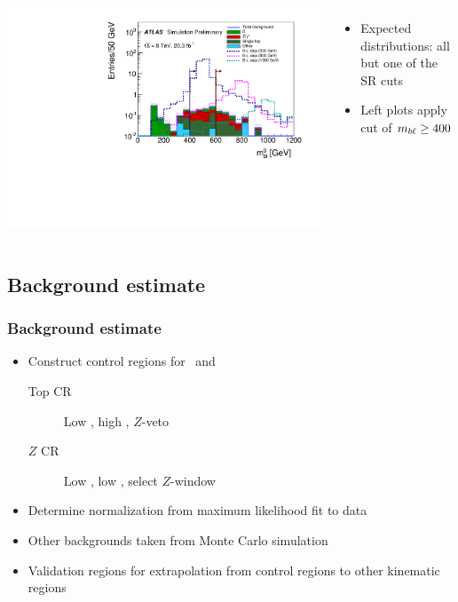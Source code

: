 \documentclass[10pt, svgnames]{beamer}
\begin{document}
\begin{frame}[t]
\begin{columns}
      \includegraphics[width=\textwidth]{figures/blstop/mbl_0_sr_minus_mbl.pdf}
    \begin{itemize}
      \item Expected distributions: all but one of the SR cuts
      \item Left plots apply cut of $m_{b\ell} \ge 400$
    \end{itemize}
  \end{columns}
\end{frame}



\subsection{Background estimate}

\begin{frame}
  \frametitle{Background estimate}
  \begin{itemize}
    \item Construct control regions for \TTBAR\ and \ZGAMMAJETS
      \begin{description}
        \item[Top CR] Low \HT, high \MET, $Z$-veto
        \item[$Z$ CR] Low \HT, low \MET, select $Z$-window
      \end{description}
    \item Determine normalization from maximum likelihood fit to data
    \item Other backgrounds taken from Monte Carlo simulation
    \item Validation regions for extrapolation from control regions to other
      kinematic regions
  \end{itemize}
\end{frame}
\end{document}
